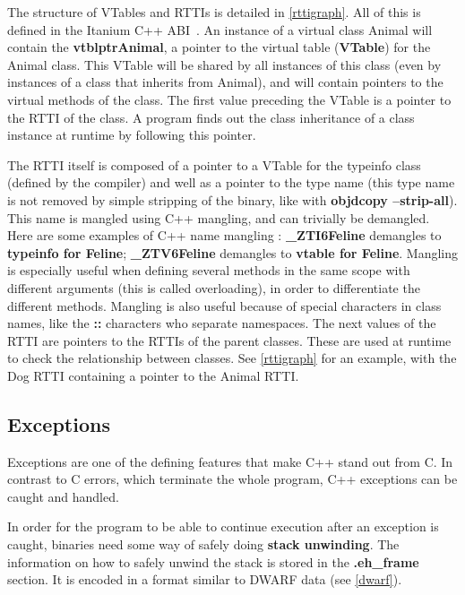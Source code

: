 \documentclass[a4paper,11pt,oneside]{report}
\begin{document}
The structure of VTables and RTTIs is detailed in \autoref{rttigraph}.
All of this is defined in the Itanium C++ ABI~\cite{cppabi}.
An instance of a virtual class Animal will contain the \textbf{vtblptrAnimal}, 
a pointer to the virtual table (\textbf{VTable}) for the Animal class.
This VTable will be shared by all instances of this class (even by instances
of a class that inherits from Animal), and will contain pointers to the virtual
methods of the class.
The first value preceding the VTable is a pointer to the RTTI of the class. A
program finds out the class inheritance of a class instance at runtime by
following this pointer.

The RTTI itself is composed of a pointer to a VTable for the typeinfo class 
(defined by the compiler) and well as a pointer to the type name (this type 
name is not removed by simple stripping of the binary, like with 
\textbf{objdcopy --strip-all}).
This name is mangled using C++ mangling, and can trivially be demangled.
Here are some examples of C++ name mangling :
\textbf{\_ZTI6Feline} demangles to \textbf{typeinfo for Feline};
\textbf{\_ZTV6Feline} demangles to \textbf{vtable for Feline}.
Mangling is especially useful when defining several methods in the same scope 
with different arguments (this is called overloading), in order to
differentiate the different methods.
Mangling is also useful because of special characters in class names, like the
\textbf{::} characters who separate namespaces.
The next values of the RTTI are pointers to the RTTIs of the parent classes.
These are used at runtime to check the relationship between classes.
See \autoref{rttigraph} for an example, with the Dog RTTI containing a pointer 
to the Animal RTTI.


\subsection{Exceptions}
\label{exceptions}

Exceptions are one of the defining features that make C++ stand out from C.
In contrast to C errors, which terminate the whole program, C++ exceptions
can be caught and handled.

In order for the program to be able to continue execution after an exception
is caught, binaries need some way of safely doing \textbf{stack unwinding}.
The information on how to safely unwind the stack is stored in the
\textbf{.eh\_frame} section. It is encoded in a format similar to DWARF data
(see \autoref{dwarf}).
\end{document}

